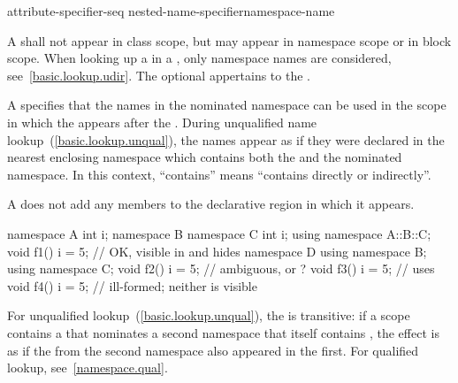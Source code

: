 \begin{bnf}
\br
    attribute-specifier-seq\opt {} nested-name-specifier\opt namespace-name \terminal{;}
\end{bnf}

\pnum
A  shall not appear in class scope, but may
appear in namespace scope or in block scope.
\enternote
When looking up a  in a
, only namespace names are considered,
see~\ref{basic.lookup.udir}.
\exitnote
The optional  appertains to the .

\pnum
A  specifies that the names in the nominated
namespace can be used in the scope in which the
 appears after the .
During unqualified name lookup~(\ref{basic.lookup.unqual}), the names
appear as if they were declared in the nearest enclosing namespace which
contains both the  and the nominated
namespace.
\enternote
In this context, ``contains'' means ``contains directly or indirectly''.
\exitnote

\pnum
A  does not add any members to the declarative
region in which it appears.
\enterexample

\begin{codeblock}
namespace A {
  int i;
  namespace B {
    namespace C {
      int i;
    }
    using namespace A::B::C;
    void f1() {
      i = 5;        // OK,  visible in  and hides 
    }
  }
  namespace D {
    using namespace B;
    using namespace C;
    void f2() {
      i = 5;        // ambiguous,  or ?
    }
  }
  void f3() {
    i = 5;          // uses 
  }
}
void f4() {
  i = 5;            // ill-formed; neither  is visible
}
\end{codeblock}
\exitexample

\pnum
For unqualified lookup~(\ref{basic.lookup.unqual}), the
 is transitive: if a scope contains a
 that nominates a second namespace that itself
contains , the effect is as if the
 from the second namespace also appeared in
the first.
\enternote For qualified lookup, see~\ref{namespace.qual}. \exitnote
\enterexample

